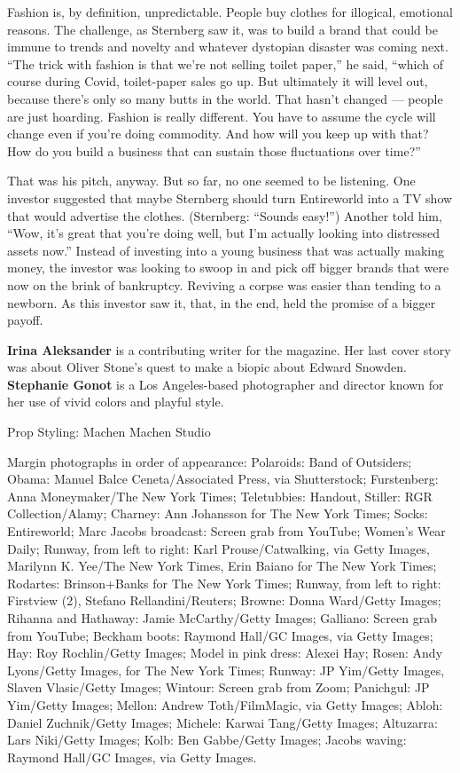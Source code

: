 Fashion is, by definition, unpredictable. People buy clothes for
illogical, emotional reasons. The challenge, as Sternberg saw it, was to
build a brand that could be immune to trends and novelty and whatever
dystopian disaster was coming next. ``The trick with fashion is that
we're not selling toilet paper,'' he said, ``which of course during
Covid, toilet-paper sales go up. But ultimately it will level out,
because there's only so many butts in the world. That hasn't changed ---
people are just hoarding. Fashion is really different. You have to
assume the cycle will change even if you're doing commodity. And how
will you keep up with that? How do you build a business that can sustain
those fluctuations over time?''

That was his pitch, anyway. But so far, no one seemed to be listening.
One investor suggested that maybe Sternberg should turn Entireworld into
a TV show that would advertise the clothes. (Sternberg: ``Sounds
easy!'') Another told him, ``Wow, it's great that you're doing well, but
I'm actually looking into distressed assets now.'' Instead of investing
into a young business that was actually making money, the investor was
looking to swoop in and pick off bigger brands that were now on the
brink of bankruptcy. Reviving a corpse was easier than tending to a
newborn. As this investor saw it, that, in the end, held the promise of
a bigger payoff.

\textbf{Irina Aleksander} is a contributing writer for the magazine. Her
last cover story was about Oliver Stone's quest to make a biopic about
Edward Snowden. \textbf{Stephanie Gonot} is a Los Angeles-based
photographer and director known for her use of vivid colors and playful
style.

Prop Styling: Machen Machen Studio

Margin photographs in order of appearance: Polaroids: Band of Outsiders;
Obama: Manuel Balce Ceneta/Associated Press, via Shutterstock;
Furstenberg: Anna Moneymaker/The New York Times; Teletubbies: Handout,
Stiller: RGR Collection/Alamy; Charney: Ann Johansson for The New York
Times; Socks: Entireworld; Marc Jacobs broadcast: Screen grab from
YouTube; Women's Wear Daily; Runway, from left to right: Karl
Prouse/Catwalking, via Getty Images, Marilynn K. Yee/The New York Times,
Erin Baiano for The New York Times; Rodartes: Brinson+Banks for The New
York Times; Runway, from left to right: Firstview (2), Stefano
Rellandini/Reuters; Browne: Donna Ward/Getty Images; Rihanna and
Hathaway: Jamie McCarthy/Getty Images; Galliano: Screen grab from
YouTube; Beckham boots: Raymond Hall/GC Images, via Getty Images; Hay:
Roy Rochlin/Getty Images; Model in pink dress: Alexei Hay; Rosen: Andy
Lyons/Getty Images, for The New York Times; Runway: JP Yim/Getty Images,
Slaven Vlasic/Getty Images; Wintour: Screen grab from Zoom; Panichgul:
JP Yim/Getty Images; Mellon: Andrew Toth/FilmMagic, via Getty Images;
Abloh: Daniel Zuchnik/Getty Images; Michele: Karwai Tang/Getty Images;
Altuzarra: Lars Niki/Getty Images; Kolb: Ben Gabbe/Getty Images; Jacobs
waving: Raymond Hall/GC Images, via Getty Images.

